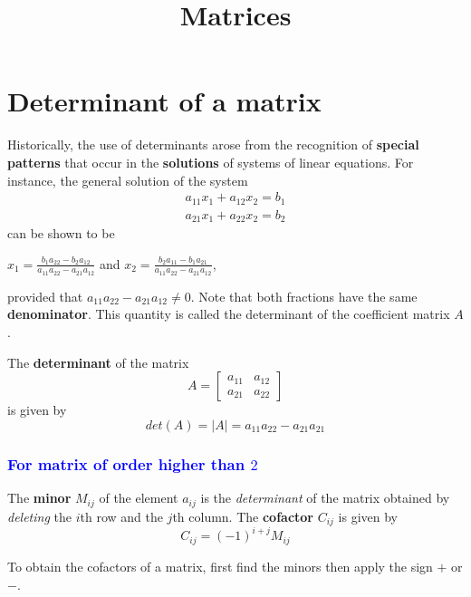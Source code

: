 \documentclass{article}
\title{Matrices}
\date{}
\newcommand\B{\textbf}
\newcommand\tcl{\begin{tcolorbox}[colback = {blue9}]}
\newcommand\etcl{\end{tcolorbox}}
\begin{document}
    
    \section{Determinant of a matrix}
        Historically, the use of determinants arose from the recognition of \textbf{special patterns} that occur
        in the \textbf{solutions} of systems of linear equations. For instance, the general solution of the system 
        \begin{equation*}
            \begin{matrix}
                a_{11}x_1 + a_{12}x_2 = b_1 \\
                a_{21}x_1 + a_{22}x_2 = b_2
            \end{matrix}
        \end{equation*}
        can be shown to be 
        \begin{center}
            $x_1 = \frac{b_1a_{22} - b_2a_{12}}{a_{11}a_{22} - a_{21}a_{12}}$ and $x_2 = \frac{b_2a_{11} - b_1a_{21}}{a_{11}a_{22} - a_{21}a_{12}} $,
        \end{center}
        provided that $a_{11}a_{22} - a_{21}a_{12} \neq 0$. Note that both fractions have the same \B{denominator}. This quantity
        is called the determinant of the coefficient matrix $A$.

        \begin{tcolorbox}[colback = {blue9}]
            The \B{determinant} of the matrix 
            \[ A = \begin{bmatrix}
                a_{11} & a_{12} \\
                a_{21} & a_{22}
            \end{bmatrix}\]
            is given by
            \[ det(A) = |A| = a_{11}a_{22} - a_{21}a_{21}\]
        \end{tcolorbox}

        \subsubsection*{\textcolor{blue}{For matrix of order higher than $2$}}
            
        \tcl
        The \B{minor} $M_{ij}$ of the element $a_{ij}$ is the \textit{determinant} of the matrix obtained by \textit{deleting} the $i$th row
        and the $j$th column. The \B{cofactor} $C_{ij}$ is given by 
        \[C_{ij} = (-1)^{i+j}M_{ij}\]
        \etcl
        To obtain the cofactors of a matrix, first find the minors then apply the sign $+$ or $-$.
\end{document}
